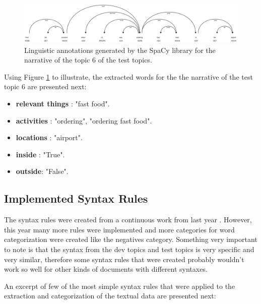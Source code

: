 \begin{figure}[H]
    \centering
    \captionsetup{justification=centering}
    \includegraphics[width =  \textwidth]{Sections/6textprocessing/images/spacy.png}
    \caption[SpaCy linguistic annotations generated]{Linguistic annotations generated by the SpaCy library \cite{Spacy2017} for the narrative of the topic 6 of the test topics.}
    \label{fig:spacy_labels}
  \end{figure}

 
Using Figure \ref{fig:spacy_labels} to illustrate, the extracted words for the the narrative of the test topic 6 are presented next:
\newpage
    \begin{itemize}
      \itemsep0em
        \item \textbf{relevant things} : "fast food".
        \item \textbf{activities} : "ordering", "ordering fast food".
        \item \textbf{locations} : "airport".
        \item \textbf{inside} : "True".
        \item \textbf{outside}: "False".
       
    \end{itemize}

  \subsection{Implemented Syntax Rules}
  The syntax rules were created from a continuous work from last year \cite{Ribeiro2019}. However, this year many more rules were implemented and more categories for word categorization were created like the negatives category. Something very important to note is that the syntax from the dev topics and test topics is very specific and very similar, therefore some syntax rules that were created probably wouldn't work so well for other kinds of documents with different syntaxes.

  An excerpt of few of the most simple syntax rules that were applied to the extraction and categorization of the textual data are presented next:
  
